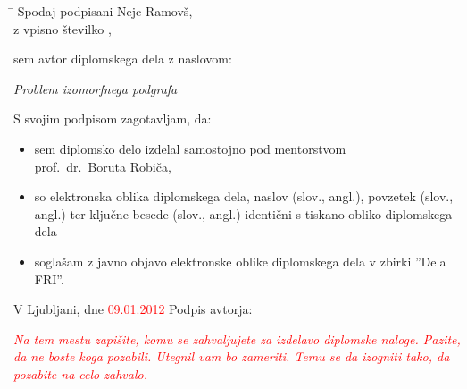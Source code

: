 \documentclass[a4paper, 12pt, ]{book}
\newcommand{\TODO}[1]{\textcolor{red}{#1}}
\newcommand{\clearemptydoublepage}{\newpage{\pagestyle{empty}\cleardoublepage}}
\begin{document}
	\vspace{1cm}
	
	\begin{tabbing}
	\hspace*{4cm}\= \kill
	Spodaj podpisani \> Nejc Ramovš,  \\[0.3cm]
	z vpisno številko , \\
	\end{tabbing}
	
	\noindent sem avtor  diplomskega dela z naslovom:
	 
	
	\vspace{0.5cm}
	\emph{Problem izomorfnega podgrafa}
	
	\vspace{1.5cm}
	\noindent S svojim podpisom zagotavljam, da:
	\begin{itemize}
		\item sem diplomsko delo izdelal samostojno pod mentorstvom\\ prof.~dr.~Boruta Robiča,
	
		\item	so elektronska oblika diplomskega dela, naslov (slov., angl.), povzetek (slov., angl.) ter 
		ključne besede (slov., angl.) identični s tiskano obliko diplomskega dela

		\item soglašam z javno objavo elektronske oblike diplomskega dela v zbirki ''Dela FRI''.
	\end{itemize}
	
	\vspace{1cm}
	\noindent V Ljubljani, dne \TODO{09.01.2012} \hspace{3cm} Podpis avtorja:
	
	\clearemptydoublepage
	
	
	
	
	\thispagestyle{empty}\mbox{}\vfill\null\it%
	\TODO {Na tem mestu zapišite, komu se zahvaljujete za izdelavo diplomske naloge. Pazite, da ne
	boste koga pozabili. Utegnil vam bo zameriti. Temu se da izogniti tako, da pozabite na celo zahvalo.}
	\rm\normalfont
	
	\clearemptydoublepage
	
	
	\def\thepage{}%
	\tableofcontents{}
	
	\clearemptydoublepage
	
\end{document}
